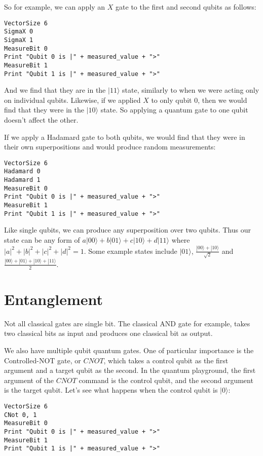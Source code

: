 \documentclass[twocolumn]{article}
\begin{document}
So for example, we can apply an $X$ gate to the first and second qubits as follows:

\begin{lstlisting}
VectorSize 6
SigmaX 0
SigmaX 1
MeasureBit 0
Print "Qubit 0 is |" + measured_value + ">"
MeasureBit 1
Print "Qubit 1 is |" + measured_value + ">"
\end{lstlisting}

And we find that they are in the $|11\rangle$ state, similarly to when we were acting only on individual qubits. Likewise, if we applied $X$ to only qubit $0$, then we would find that they were in the $|10\rangle$ state. So applying a quantum gate to one qubit doesn't affect the other.

If we apply a Hadamard gate to both qubits, we would find that they were in their own superpositions and would produce random measurements:

\begin{lstlisting}
VectorSize 6
Hadamard 0
Hadamard 1
MeasureBit 0
Print "Qubit 0 is |" + measured_value + ">"
MeasureBit 1
Print "Qubit 1 is |" + measured_value + ">"
\end{lstlisting}

Like single qubits, we can produce any superposition over two qubits. Thus our state can be any form of $a|00\rangle + b|01\rangle + c|10\rangle + d|11\rangle$ where $|a|^2 + |b|^2 + |c|^2 + |d|^2 = 1$. Some example states include $|01\rangle$, $\frac{|00\rangle + |10\rangle}{\sqrt{2}}$ and $\frac{|00\rangle + |01\rangle + |10\rangle + |11\rangle}{2}$.

\section{Entanglement}
\label{sec:entanglement}

Not all classical gates are single bit. The classical AND gate for example, takes two classical bits as input and produces one classical bit as output.

We also have multiple qubit quantum gates. One of particular importance is the Controlled-NOT gate, or $CNOT$, which takes a control qubit as the first argument and a target qubit as the second. In the quantum playground, the first argument of the $CNOT$ command is the control qubit, and the second argument is the target qubit. Let's see what happens when the control qubit is $|0\rangle$:

\begin{lstlisting}
VectorSize 6
CNot 0, 1
MeasureBit 0
Print "Qubit 0 is |" + measured_value + ">"
MeasureBit 1
Print "Qubit 1 is |" + measured_value + ">"
\end{lstlisting}
\end{document}
